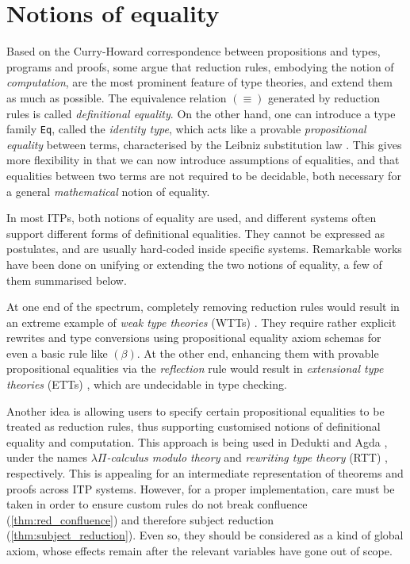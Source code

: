\documentclass[twoside]{report}
\begin{document}
\section{Notions of equality}
\label{sec:notions_of_equality}

Based on the Curry-Howard correspondence between propositions and types, programs and proofs, some argue that reduction rules, embodying the notion of \emph{computation}, are the most prominent feature of type theories, and extend them as much as possible. The equivalence relation $(\equiv)$ generated by reduction rules is called \emph{definitional equality}. On the other hand, one can introduce a type family \texttt{Eq}, called the \emph{identity type}, which acts like a provable \emph{propositional equality} between terms, characterised by the Leibniz substitution law \cite{program2013homotopy}. This gives more flexibility in that we can now introduce assumptions of equalities, and that equalities between two terms are not required to be decidable, both necessary for a general \emph{mathematical} notion of equality.

In most ITPs, both notions of equality are used, and different systems often support different forms of definitional equalities. They cannot be expressed as postulates, and are usually hard-coded inside specific systems. Remarkable works have been done on unifying or extending the two notions of equality, a few of them summarised below.

At one end of the spectrum, completely removing reduction rules would result in an extreme example of \emph{weak type theories} (WTTs) \cite{berg2021quadratic}. They require rather explicit rewrites and type conversions using propositional equality axiom schemas for even a basic rule like $(\beta)$. At the other end, enhancing them with provable propositional equalities via the \emph{reflection} rule would result in \emph{extensional type theories} (ETTs) \cite{constable1986implementing}, which are undecidable in type checking. %

Another idea is allowing users to specify certain propositional equalities to be treated as reduction rules, thus supporting customised notions of definitional equality and computation. This approach is being used in Dedukti \cite{assaf2023dedukti} and Agda \cite{norell2007towards}, under the names \emph{$\lambda\Pi$-calculus modulo theory} \cite{boespflug2012lambdapi} and \emph{rewriting type theory} (RTT) \cite{cockx2021taming}, respectively. This is appealing for an intermediate representation of theorems and proofs across ITP systems. However, for a proper implementation, care must be taken in order to ensure custom rules do not break confluence (\cref{thm:red_confluence}) and therefore subject reduction (\cref{thm:subject_reduction}). Even so, they should be considered as a kind of global axiom, whose effects remain after the relevant variables have gone out of scope.
\end{document}
